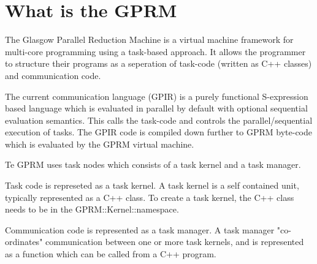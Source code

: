 \section{What is the GPRM}

The Glasgow Parallel Reduction Machine is a virtual machine framework for multi-core programming using a task-based approach. It allows the programmer to structure their programs as a seperation of task-code (written as C++ classes) and communication code. 

The current communication language (GPIR) is a purely functional S-expression based language which is evaluated in parallel by default with optional sequential
evaluation semantics. This calls the task-code and controls the parallel/sequential execution of tasks. The GPIR code is compiled down further
to GPRM byte-code which is evaluated by the GPRM virtual machine.

Te GPRM uses task nodes which consists of a task kernel and a task manager.

Task code is represeted as a task kernel. A task kernel is a self contained unit, typically represented as a C++ class.
To create a task kernel, the C++ class needs to be in the GPRM::Kernel::namespace.

Communication code is represented as a task manager. A task manager "co-ordinates" communication between one or more task kernels, and
is represented as a function which can be called from a C++ program.\cite{GPRM}

